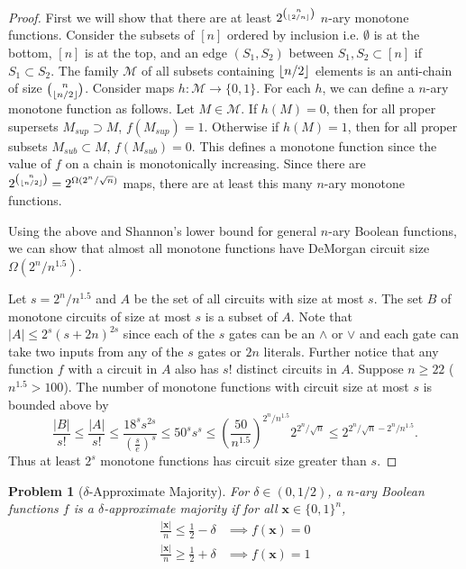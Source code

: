 \documentclass[11pt]{article}
\newcommand\vv[1]{\mathbf{#1}}
\newcommand\family[1]{\mathcal{#1}}
\newtheorem{problem}{Problem}
\DeclarePairedDelimiter\floor{\lfloor}{\rfloor}
\begin{document}
\begin{proof}
First we will show that there are at least $2^{\binom{n}{\floor{2/n}}}$ $n$-ary monotone functions. Consider the subsets of $[n]$ ordered by inclusion i.e. $\emptyset$ is at the bottom, $[n]$ is at the top, and an edge $(S_1, S_2)$ between $S_1, S_2 \subset [n]$ if $S_1 \subset S_2$. The family $\family{M}$ of all subsets containing $\floor{n/2}$ elements is an anti-chain of size $\binom{n}{\floor{n/2}}$. Consider maps $h: \family{M} \rightarrow \{0,1\}$. For each $h$, we can define a $n$-ary monotone function as follows. Let $M \in \family{M}$. If $h(M) = 0$, then for all proper supersets $M_{sup} \supset M$, $f(M_{sup}) = 1$. Otherwise if $h(M) = 1$, then for all proper subsets $M_{sub} \subset M$, $f(M_{sub}) = 0$. This defines a monotone function since the value of $f$ on a chain is monotonically increasing. Since there are  $2^{\binom{n}{\floor{n/2}}} = 2^{\Omega(2^n/\sqrt{n})}$ maps, there are at least this many $n$-ary monotone functions. 

Using the above and Shannon's lower bound for general $n$-ary Boolean functions, we can show that almost all monotone functions have DeMorgan circuit size $\Omega(2^n/n^{1.5})$. 

Let $s = 2^n/n^{1.5}$ and $A$ be the set of all circuits with size at most $s$. The set $B$ of monotone circuits of size at most $s$ is a subset of $A$. Note that $|A| \leq 2^{s}(s + 2n)^{2s}$ since each of the $s$ gates can be an $\land$ or $\lor$ and each gate can take two inputs from any of the $s$ gates or $2n$ literals. Further notice that any function $f$ with a circuit in $A$ also has $s!$ distinct circuits in $A$. Suppose $n \geq 22$ ($n^{1.5}> 100$). The number of monotone functions with circuit size at most $s$ is bounded above by
\[\frac{|B|}{s!} \leq \frac{|A|}{s!} \leq \frac{18^ss^{2s}}{\left(\frac{s}{e}\right)^s} \leq 50^ss^s \leq \left(\frac{50}{n^{1.5}}\right)^{2^n/n^{1.5}}2^{2^n/\sqrt{n}}\leq 2^{2^n/\sqrt{n} - 2^n/n^{1.5}}.\]
Thus at least $2^s$ monotone functions has circuit size greater than $s$.  
\end{proof}
\vspace{1em}
\begin{problem}[$\delta$-Approximate Majority] For $\delta \in (0,1/2)$, a $n$-ary Boolean functions $f$ is a $\delta$-approximate majority if for all $\vv{x} \in \{0,1\}^n$, 
	\begin{align*}
	\frac{|\vv{x}|}{n} \leq \frac{1}{2} - \delta &\implies f(\vv{x})= 0\\
	\frac{|\vv{x}|}{n} \geq \frac{1}{2} + \delta &\implies f(\vv{x})= 1\\
	\end{align*}
\end{problem}
\end{document}
